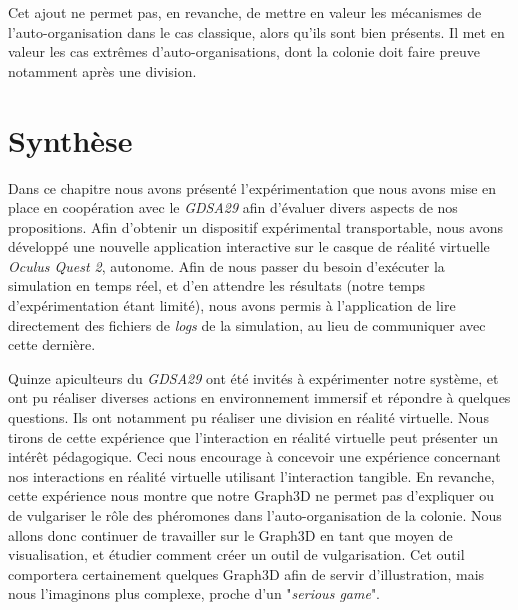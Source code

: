 	Cet ajout ne permet pas, en revanche, de mettre en valeur les mécanismes de l'auto-organisation dans le cas classique, alors qu'ils sont bien présents. Il met en valeur les cas extrêmes d'auto-organisations, dont la colonie doit faire preuve notamment après une division.
			
	\section*{Synthèse}
	Dans ce chapitre nous avons présenté l'expérimentation que nous avons mise en place en coopération avec le \textit{GDSA29} afin d'évaluer divers aspects de nos propositions. Afin d'obtenir un dispositif expérimental transportable, nous avons développé une nouvelle application interactive sur le casque de réalité virtuelle \textit{Oculus Quest 2}, autonome. Afin de nous passer du besoin d'exécuter la simulation en temps réel, et d'en attendre les résultats (notre temps d'expérimentation étant limité), nous avons permis à l'application de lire directement des fichiers de \textit{logs} de la simulation, au lieu de communiquer avec cette dernière.
	
	Quinze apiculteurs du \textit{GDSA29} ont été invités à expérimenter notre système, et ont pu réaliser diverses actions en environnement immersif et répondre à quelques questions. Ils ont notamment pu réaliser une division en réalité virtuelle. Nous tirons de cette expérience que l'interaction en réalité virtuelle peut présenter un intérêt pédagogique. Ceci nous encourage à concevoir une expérience concernant nos interactions en réalité virtuelle utilisant l'interaction tangible. En revanche, cette expérience nous montre que notre Graph3D ne permet pas d'expliquer ou de vulgariser le rôle des phéromones dans l'auto-organisation de la colonie. Nous allons donc continuer de travailler sur le Graph3D en tant que moyen de visualisation, et étudier comment créer un outil de vulgarisation. Cet outil comportera certainement quelques Graph3D afin de servir d'illustration, mais nous l'imaginons plus complexe, proche d'un "\textit{serious game}".